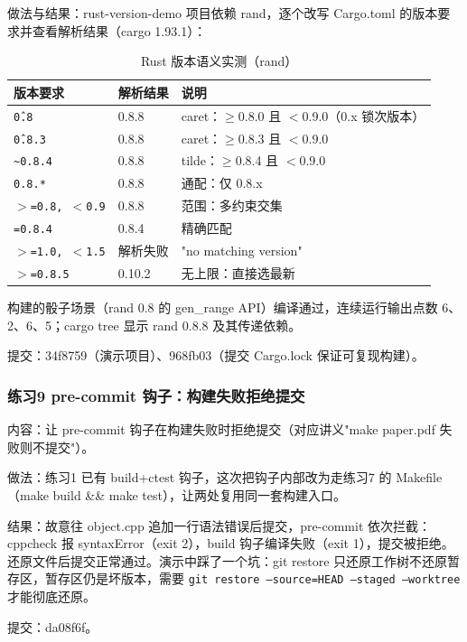 \documentclass[UTF8]{ctexart}
\begin{document}
做法与结果：rust-version-demo 项目依赖 rand，逐个改写 Cargo.toml 的版本要求并查看解析结果（cargo 1.93.1）：

\begin{table}[htbp]
\centering
\caption{Rust 版本语义实测（rand）}
\label{tab:rust}
\begin{tabular}{lll}
\toprule
版本要求 & 解析结果 & 说明 \\
\midrule
\texttt{\^0.8} & 0.8.8 & caret：$\geq$0.8.0 且 $<$0.9.0（0.x 锁次版本） \\
\texttt{\^0.8.3} & 0.8.8 & caret：$\geq$0.8.3 且 $<$0.9.0 \\
\texttt{\textasciitilde0.8.4} & 0.8.8 & tilde：$\geq$0.8.4 且 $<$0.9.0 \\
\texttt{0.8.*} & 0.8.8 & 通配：仅 0.8.x \\
\texttt{$>$=0.8, $<$0.9} & 0.8.8 & 范围：多约束交集 \\
\texttt{=0.8.4} & 0.8.4 & 精确匹配 \\
\texttt{$>$=1.0, $<$1.5} & 解析失败 & "no matching version" \\
\texttt{$>$=0.8.5} & 0.10.2 & 无上限：直接选最新 \\
\bottomrule
\end{tabular}
\end{table}

构建的骰子场景（rand 0.8 的 gen\_range API）编译通过，连续运行输出点数 6、2、6、5；cargo tree 显示 rand 0.8.8 及其传递依赖。

提交：34f8759（演示项目）、968fb03（提交 Cargo.lock 保证可复现构建）。

\subsubsection{练习9 pre-commit 钩子：构建失败拒绝提交}

内容：让 pre-commit 钩子在构建失败时拒绝提交（对应讲义"make paper.pdf 失败则不提交"）。

做法：练习1 已有 build+ctest 钩子，这次把钩子内部改为走练习7 的 Makefile（make build \&\& make test），让两处复用同一套构建入口。

结果：故意往 object.cpp 追加一行语法错误后提交，pre-commit 依次拦截：cppcheck 报 syntaxError（exit 2），build 钩子编译失败（exit 1），提交被拒绝。还原文件后提交正常通过。演示中踩了一个坑：git restore 只还原工作树不还原暂存区，暂存区仍是坏版本，需要 \texttt{git restore --source=HEAD --staged --worktree} 才能彻底还原。

提交：da08f6f。
\end{document}

